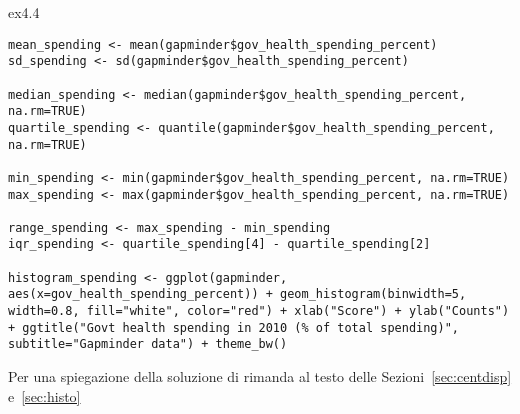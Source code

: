 \begin{solution}{ex4.4}
	
\begin{lstlisting}[style=Rstylescript]
mean_spending <- mean(gapminder$gov_health_spending_percent)
sd_spending <- sd(gapminder$gov_health_spending_percent)

median_spending <- median(gapminder$gov_health_spending_percent, na.rm=TRUE)
quartile_spending <- quantile(gapminder$gov_health_spending_percent, na.rm=TRUE)

min_spending <- min(gapminder$gov_health_spending_percent, na.rm=TRUE)
max_spending <- max(gapminder$gov_health_spending_percent, na.rm=TRUE)

range_spending <- max_spending - min_spending
iqr_spending <- quartile_spending[4] - quartile_spending[2]

histogram_spending <- ggplot(gapminder, aes(x=gov_health_spending_percent)) + geom_histogram(binwidth=5, width=0.8, fill="white", color="red") + xlab("Score") + ylab("Counts") + ggtitle("Govt health spending in 2010 (% of total spending)", subtitle="Gapminder data") + theme_bw()
\end{lstlisting}

\noindent Per una spiegazione della soluzione di rimanda al testo delle Sezioni~\ref{sec:centdisp} e~\ref{sec:histo}

\end{solution}


\vspace{0.5cm}


